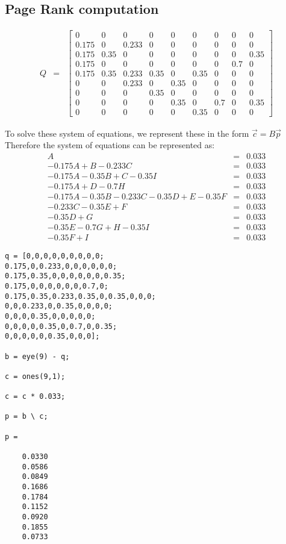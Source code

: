 \documentclass{article}
\begin{document}
\subsection{\textbf{Page Rank computation}}
\[
\begin{array}{lcl}Q & = &
\begin{bmatrix} 0 & 0 & 0 & 0 & 0 & 0 & 0 & 0 & 0 \\ 0.175 & 0 & 0.233 & 0 & 0 & 0 & 0 & 0 & 0 \\ 0.175 & 0. 35 & 0 & 0 & 0 & 0 & 0 & 0 & 0.35 \\ 0.175 & 0 & 0 & 0 & 0& 0 & 0 & 0.7 & 0 \\ 0.175 & 0.35 & 0.233 & 0.35 & 0 & 0.35 & 0 & 0 & 0 \\ 0 & 0 & 0.233 & 0 & 0.35 & 0 & 0 & 0 & 0 \\ 0 & 0 & 0 & 0.35 & 0 & 0 & 0 & 0 & 0 \\ 0 & 0 & 0 & 0 & 0.35 & 0 & 0.7 & 0 & 0.35 \\ 0 & 0 & 0 & 0 & 0 & 0.35 & 0 & 0 & 0
\end{bmatrix}
\end{array}
\]

To solve these system of equations, we represent these in the form $\vec{c} = B\vec{p}$
Therefore the system of equations can be represented as:
\[
\begin{array}{rcl}A & = & 0.033 \\ -0.175A + B - 0.233C & = & 0.033 \\ -0.175A - 0.35B + C - 0.35I & = & 0.033 \\ -0.175A + D - 0.7H & = & 0.033 \\ -0.175A - 0.35B - 0.233C -0.35D + E - 0.35F & = &0.033 \\ -0.233C - 0.35E + F & = & 0.033 \\ -0.35D + G & = & 0.033 \\ -0.35E - 0.7G + H - 0.35I & = & 0.033 \\ -0.35F + I & = & 0.033 
\end{array}
\]
\begin{lstlisting}
q = [0,0,0,0,0,0,0,0,0;
0.175,0,0.233,0,0,0,0,0,0;
0.175,0.35,0,0,0,0,0,0,0.35;
0.175,0,0,0,0,0,0,0.7,0;
0.175,0.35,0.233,0.35,0,0.35,0,0,0;
0,0,0.233,0,0.35,0,0,0,0;
0,0,0,0.35,0,0,0,0,0;
0,0,0,0,0.35,0,0.7,0,0.35;
0,0,0,0,0,0.35,0,0,0];

b = eye(9) - q;

c = ones(9,1);

c = c * 0.033;

p = b \ c;

p =

    0.0330
    0.0586
    0.0849
    0.1686
    0.1784
    0.1152
    0.0920
    0.1855
    0.0733
\end{lstlisting}
\end{document}
